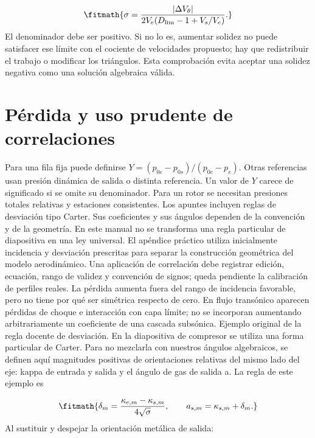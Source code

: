 \documentclass[10pt,openany]{book}
\begin{document}
\[
\fitmath{\sigma=\frac{|\Delta V_\theta|}{2V_e(D_{\mathrm{lim}}-1+V_s/V_e)}.}
\]
El denominador debe ser positivo. Si no lo es, aumentar solidez no puede satisfacer ese límite con el cociente de velocidades propuesto; hay que redistribuir el trabajo o modificar los triángulos. Esta comprobación evita aceptar una solidez negativa como una solución algebraica válida.

\section{Pérdida y uso prudente de correlaciones}

Para una fila fija puede definirse \(Y=(p_{0e}-p_{0s})/(p_{0e}-p_e)\). Otras referencias usan presión dinámica de salida o distinta referencia. Un valor de \(Y\) carece de significado si se omite su denominador. Para un rotor se necesitan presiones totales relativas y estaciones consistentes.
Los apuntes incluyen reglas de desviación tipo Carter. Sus coeficientes y sus ángulos dependen de la convención y de la geometría. En este manual no se transforma una regla particular de diapositiva en una ley universal. El apéndice práctico utiliza inicialmente incidencia y desviación prescritas para separar la construcción geométrica del modelo aerodinámico. Una aplicación de correlación debe registrar edición, ecuación, rango de validez y convención de signos; queda pendiente la calibración de perfiles reales.
La pérdida aumenta fuera del rango de incidencia favorable, pero no tiene por qué ser simétrica respecto de cero. En flujo transónico aparecen pérdidas de choque e interacción con capa límite; no se incorporan aumentando arbitrariamente un coeficiente de una cascada subsónica.
Ejemplo original de la regla docente de desviación. En la diapositiva de compresor se utiliza una forma particular de Carter. Para no mezclarla con nuestros ángulos algebraicos, se definen aquí magnitudes positivas de orientaciones relativas del mismo lado del eje: kappa de entrada y salida y el ángulo de gas de salida a. La regla de este ejemplo es

\[
\fitmath{\delta_m=\frac{\kappa_{e,m}-\kappa_{s,m}}{4\sqrt{\sigma}},\qquad a_{s,m}=\kappa_{s,m}+\delta_m.}
\]
Al sustituir y despejar la orientación metálica de salida:
\end{document}
